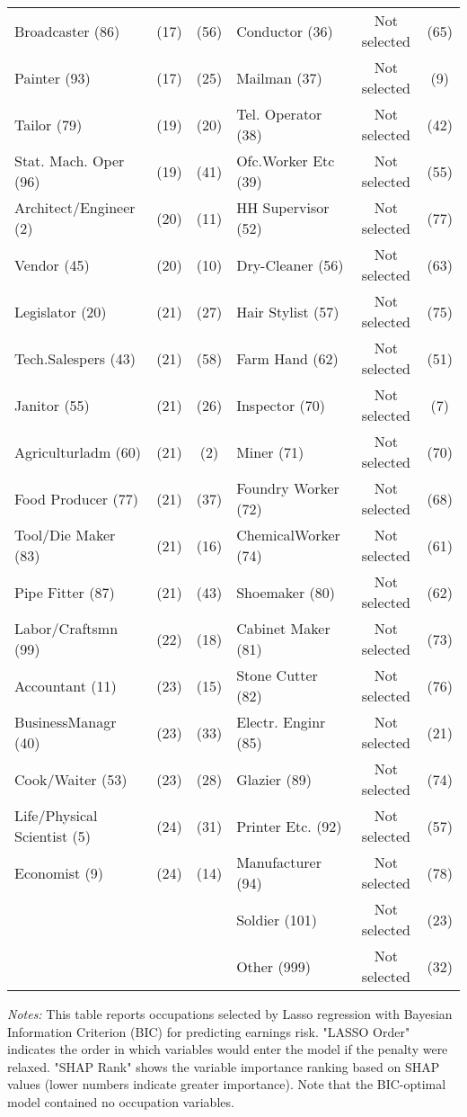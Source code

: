 \documentclass[12pt]{article}
\begin{document}
\begin{table}[ht]
\begin{tabular}{lcc|lcc}
Broadcaster (86) & (17) & (56) & Conductor (36) & Not selected & (65) \\
Painter (93) & (17) & (25) & Mailman (37) & Not selected & (9) \\
Tailor (79) & (19) & (20) & Tel. Operator (38) & Not selected & (42) \\
Stat. Mach. Oper (96) & (19) & (41) & Ofc.Worker Etc (39) & Not selected & (55) \\
Architect/Engineer (2) & (20) & (11) & HH Supervisor (52) & Not selected & (77) \\
Vendor (45) & (20) & (10) & Dry-Cleaner (56) & Not selected & (63) \\
Legislator (20) & (21) & (27) & Hair Stylist (57) & Not selected & (75) \\
Tech.Salespers (43) & (21) & (58) & Farm Hand (62) & Not selected & (51) \\
Janitor (55) & (21) & (26) & Inspector (70) & Not selected & (7) \\
Agriculturladm (60) & (21) & (2) & Miner (71) & Not selected & (70) \\
Food Producer (77) & (21) & (37) & Foundry Worker (72) & Not selected & (68) \\
Tool/Die Maker (83) & (21) & (16) & ChemicalWorker (74) & Not selected & (61) \\
Pipe Fitter (87) & (21) & (43) & Shoemaker (80) & Not selected & (62) \\
Labor/Craftsmn (99) & (22) & (18) & Cabinet Maker (81) & Not selected & (73) \\
Accountant (11) & (23) & (15) & Stone Cutter (82) & Not selected & (76) \\
BusinessManagr (40) & (23) & (33) & Electr. Enginr (85) & Not selected & (21) \\
Cook/Waiter (53) & (23) & (28) & Glazier (89) & Not selected & (74) \\
Life/Physical Scientist (5) & (24) & (31) & Printer Etc. (92) & Not selected & (57) \\
Economist (9) & (24) & (14) & Manufacturer (94) & Not selected & (78) \\
& & & Soldier (101) & Not selected & (23) \\
& & & Other (999) & Not selected & (32) \\
\bottomrule
\end{tabular}%
\newline

\footnotesize
\textit{Notes:} This table reports occupations selected by Lasso regression with Bayesian Information Criterion (BIC) for predicting earnings risk. "LASSO Order" indicates the order in which variables would enter the model if the penalty were relaxed. "SHAP Rank" shows the variable importance ranking based on SHAP values (lower numbers indicate greater importance). Note that the BIC-optimal model contained no occupation variables.

\end{table}
\end{document}
